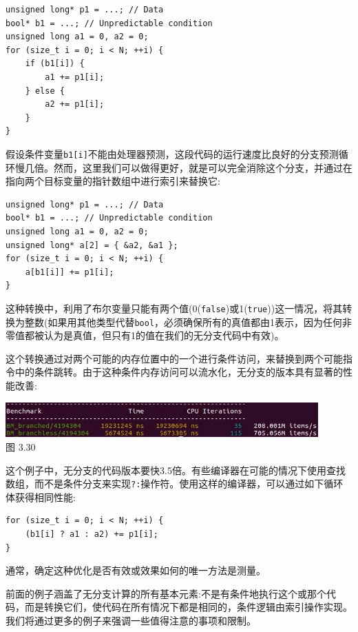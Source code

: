 \begin{lstlisting}[style=styleCXX]
unsigned long* p1 = ...; // Data
bool* b1 = ...; // Unpredictable condition
unsigned long a1 = 0, a2 = 0;
for (size_t i = 0; i < N; ++i) {
	if (b1[i]) {
		a1 += p1[i];
	} else {
		a2 += p1[i];
	}
}
\end{lstlisting}

假设条件变量\texttt{b1[i]}不能由处理器预测，这段代码的运行速度比良好的分支预测循环慢几倍。然而，这里我们可以做得更好，就是可以完全消除这个分支，并通过在指向两个目标变量的指针数组中进行索引来替换它:

\begin{lstlisting}[style=styleCXX]
unsigned long* p1 = ...; // Data
bool* b1 = ...; // Unpredictable condition
unsigned long a1 = 0, a2 = 0;
unsigned long* a[2] = { &a2, &a1 };
for (size_t i = 0; i < N; ++i) {
	a[b1[i]] += p1[i];
}
\end{lstlisting}

这种转换中，利用了布尔变量只能有两个值(0(\texttt{false})或1(\texttt{true}))这一情况，将其转换为整数(如果用其他类型代替\texttt{bool}，必须确保所有的真值都由1表示，因为任何非零值都被认为是真值，但只有1的值在我们的无分支代码中有效)。

这个转换通过对两个可能的内存位置中的一个进行条件访问，来替换到两个可能指令中的条件跳转。由于这种条件内存访问可以流水化，无分支的版本具有显著的性能改善:

\begin{center}
\includegraphics[width=0.9\textwidth]{content/1/chapter3/images/30.jpg}\\
图 3.30
\end{center}

这个例子中，无分支的代码版本要快3.5倍。有些编译器在可能的情况下使用查找数组，而不是条件分支来实现\texttt{?:}操作符。使用这样的编译器，可以通过如下循环体获得相同性能:

\begin{lstlisting}[style=styleCXX]
for (size_t i = 0; i < N; ++i) {
	(b1[i] ? a1 : a2) += p1[i];
}
\end{lstlisting}

通常，确定这种优化是否有效或效果如何的唯一方法是测量。

前面的例子涵盖了无分支计算的所有基本元素:不是有条件地执行这个或那个代码，而是转换它们，使代码在所有情况下都是相同的，条件逻辑由索引操作实现。我们将通过更多的例子来强调一些值得注意的事项和限制。

